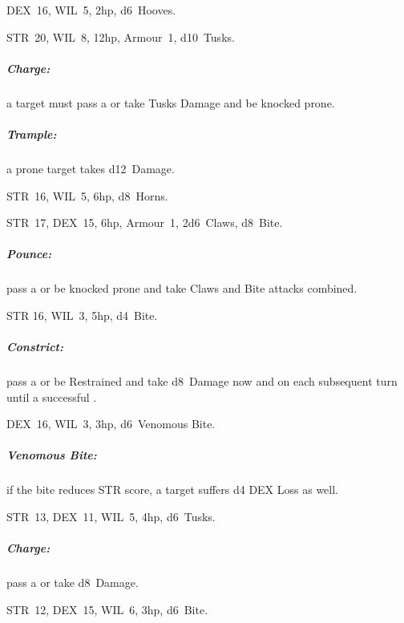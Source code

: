 \documentclass[itdr]{subfiles}
\begin{document}
\vfill

DEX~16, WIL~5, 2hp, d6~Hooves.

\vfill

STR~20, WIL~8, 12hp, Armour~1, d10~Tusks.
\subparagraph{Charge:} a target must pass a  or take Tusks Damage and be knocked prone.
\subparagraph{Trample:} a prone target takes d12~Damage.

\vfill

STR~16, WIL~5, 6hp, d8~Horns.

\vfill

STR~17, DEX~15, 6hp, Armour~1, 2d6~Claws, d8~Bite.
\subparagraph{Pounce:} pass a  or be knocked prone and take Claws and Bite attacks combined.

\vfill

STR 16, WIL~3, 5hp, d4~Bite.
\subparagraph{Constrict:} pass a  or be Restrained and take d8~Damage now and on each subsequent turn until a successful .

\vfill

DEX~16, WIL~3, 3hp, d6~Venomous Bite.
\subparagraph{Venomous Bite:} if the bite reduces STR score, a target suffers d4 DEX Loss as well.

\vfill

STR~13, DEX~11, WIL~5, 4hp, d6~Tusks.
\subparagraph{Charge:} pass a  or take d8~Damage.

\vfill

STR~12, DEX~15, WIL~6, 3hp, d6~Bite.

\vfill
~
\end{document}
